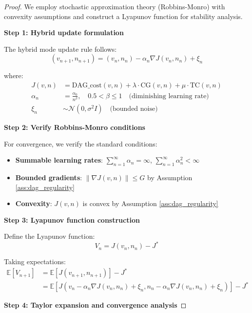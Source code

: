 \documentclass[11pt]{article}
\theoremstyle{definition}
\begin{document}
\begin{proof}
We employ stochastic approximation theory (Robbins-Monro) with convexity assumptions and construct a Lyapunov function for stability analysis.

\textbf{Step 1: Hybrid update formulation}

The hybrid mode update rule follows:
\begin{equation}
(v_{n+1}, n_{n+1}) = (v_n, n_n) - \alpha_n \nabla J(v_n, n_n) + \xi_n
\end{equation}

where:
\begin{align}
J(v,n) &= \text{DAG\_cost}(v,n) + \lambda \cdot \text{CG}(v,n) + \mu \cdot \text{TC}(v,n) \\
\alpha_n &= \frac{\alpha_0}{n^\beta}, \quad 0.5 < \beta \leq 1 \quad \text{(diminishing learning rate)} \\
\xi_n &\sim \mathcal{N}(0, \sigma^2 I) \quad \text{(bounded noise)}
\end{align}

\textbf{Step 2: Verify Robbins-Monro conditions}

For convergence, we verify the standard conditions:

\begin{itemize}
\item \textbf{Summable learning rates}: $\sum_{n=1}^\infty \alpha_n = \infty$, $\sum_{n=1}^\infty \alpha_n^2 < \infty$
\item \textbf{Bounded gradients}: $\|\nabla J(v,n)\| \leq G$ by Assumption \ref{ass:dag_regularity}
\item \textbf{Convexity}: $J(v,n)$ is convex by Assumption \ref{ass:dag_regularity}
\end{itemize}

\textbf{Step 3: Lyapunov function construction}

Define the Lyapunov function:
\begin{equation}
V_n = J(v_n, n_n) - J^*
\end{equation}

Taking expectations:
\begin{align}
\mathbb{E}[V_{n+1}] &= \mathbb{E}[J(v_{n+1}, n_{n+1})] - J^* \\
&= \mathbb{E}[J(v_n - \alpha_n \nabla J(v_n, n_n) + \xi_n, n_n - \alpha_n \nabla J(v_n, n_n) + \xi_n)] - J^*
\end{align}

\textbf{Step 4: Taylor expansion and convergence analysis}


\end{proof}
\end{document}
